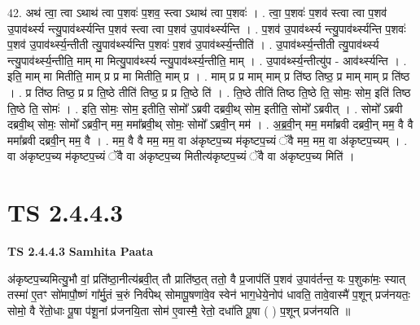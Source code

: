 \documentclass[17pt]{extarticle}
\begin{document}
42. अथ॑ त्वा॒ त्वा ऽथाथ॑ त्वा प॒शवः॑ प॒शव॒ स्त्वा ऽथाथ॑ त्वा प॒शवः॑ । . त्वा॒ प॒शवः॑ प॒शव॑ स्त्वा त्वा प॒शव॑ उ॒पाव॑र्थ्स्य न्त्यु॒पाव॑र्थ्स्यन्ति प॒शव॑ स्त्वा त्वा प॒शव॑ उ॒पाव॑र्थ्स्यन्ति । . प॒शव॑ उ॒पाव॑र्थ्स्य न्त्यु॒पाव॑र्थ्स्यन्ति प॒शवः॑ प॒शव॑ उ॒पाव॑र्थ्स्य॒न्तीती त्यु॒पाव॑र्थ्स्यन्ति प॒शवः॑ प॒शव॑ उ॒पाव॑र्थ्स्य॒न्तीति॑ । . उ॒पाव॑र्थ्स्य॒न्तीती त्यु॒पाव॑र्थ्स्य न्त्यु॒पाव॑र्थ्स्य॒न्तीति॒ माम् मा मित्यु॒पाव॑र्थ्स्य न्त्यु॒पाव॑र्थ्स्य॒न्तीति॒ माम् । . उ॒पाव॑र्थ्स्य॒न्तीत्यु॑प - आव॑र्थ्स्यन्ति । . इति॒ माम् मा मितीति॒ माम् प्र प्र मा मितीति॒ माम् प्र । . माम् प्र प्र माम् माम् प्र ति॑ष्ठ तिष्ठ॒ प्र माम् माम् प्र ति॑ष्ठ । . प्र ति॑ष्ठ तिष्ठ॒ प्र प्र ति॒ष्ठे तीति॑ तिष्ठ॒ प्र प्र ति॒ष्ठे ति॑ । . ति॒ष्ठे तीति॑ तिष्ठ ति॒ष्ठे ति॒ सोमः॒ सोम॒ इति॑ तिष्ठ ति॒ष्ठे ति॒ सोमः॑ । . इति॒ सोमः॒ सोम॒ इतीति॒ सोमो᳚ ऽब्रवी दब्रवी॒थ् सोम॒ इतीति॒ सोमो᳚ ऽब्रवीत् । . सोमो᳚ ऽब्रवी दब्रवी॒थ् सोमः॒ सोमो᳚ ऽब्रवी॒न् मम॒ ममा᳚ब्रवी॒थ् सोमः॒ सोमो᳚ ऽब्रवी॒न् मम॑ । . अ॒ब्र॒वी॒न् मम॒ ममा᳚ब्रवी दब्रवी॒न् मम॒ वै वै ममा᳚ब्रवी दब्रवी॒न् मम॒ वै । . मम॒ वै वै मम॒ मम॒ वा अ॑कृष्टप॒च्य म॑कृष्टप॒च्यं ॅवै मम॒ मम॒ वा अ॑कृष्टप॒च्यम् । . वा अ॑कृष्टप॒च्य म॑कृष्टप॒च्यं ॅवै वा अ॑कृष्टप॒च्य मितीत्य॑कृष्टप॒च्यं ॅवै वा अ॑कृष्टप॒च्य मिति॑ । \newline
\pagebreak
{}
\section*{ TS 2.4.4.3 }

\textbf{TS 2.4.4.3 } \newline
\textbf{Samhita Paata} \newline

अ॑कृष्टप॒च्यमित्यु॒भौ वां॒ प्रति॑ष्ठा॒नीत्य॑ब्रवी॒त् तौ प्राति॑ष्ठ॒त् ततो॒ वै प्र॒जाप॑तिं प॒शव॑ उ॒पाव॑र्तन्त॒ यः प॒शुका॑मः॒ स्यात् तस्मा॑ ए॒तꣳ सो॑मापौ॒ष्णं गा᳚र्मु॒तं च॒रुं निर्व॑पेथ् सोमापू॒षणा॑वे॒व स्वेन॑ भाग॒धेये॒नोप॑ धावति॒ तावे॒वास्मै॑ प॒शून् प्रज॑नयतः॒ सोमो॒ वै रे॑तो॒धाः पू॒षा प॑शू॒नां प्र॑जनयि॒ता सोम॑ ए॒वास्मै॒ रेतो॒ दधा॑ति पू॒षा ( ) प॒शून् प्रज॑नयति ॥ \newline
\end{document}
